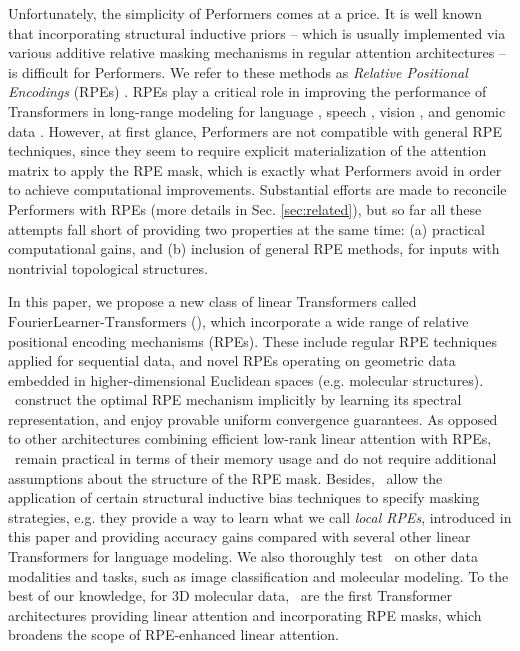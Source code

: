 Unfortunately, the simplicity of Performers comes at a price. It is well known that incorporating structural inductive priors -- which is usually implemented via various additive relative masking mechanisms in regular attention architectures -- is difficult for Performers. We refer to these methods as \textit{Relative Positional Encodings} (RPEs) \cite{shaw,raffel,li2021can,luo2022your}.
RPEs play a critical role in improving the performance of Transformers in long-range modeling for language \cite{dai-etal-2019-transformer}, speech \cite{liutkus}, vision \cite{wupeng}, and genomic data \cite{Avsec2021EffectiveGE}. However, at first glance, Performers are not compatible with general RPE techniques, since they seem to require explicit materialization of the attention matrix to apply the RPE mask, which is exactly what Performers avoid in order to achieve computational improvements.
Substantial efforts are made to reconcile Performers with RPEs (more details in Sec. \ref{sec:related}), but so far all these attempts fall short of providing two properties at the same time: (a) practical computational gains, and (b) inclusion of general RPE methods, for inputs with nontrivial topological structures.

In this paper, we propose a new class of linear Transformers called $\mathrm{FourierLearner}$-$\mathrm{Transformers}$ (\FLTs), which incorporate a wide range of relative positional encoding mechanisms (RPEs). These include regular RPE techniques applied for sequential data, and novel RPEs operating on geometric data embedded in higher-dimensional Euclidean spaces (e.g. molecular structures). \FLTs\ construct the optimal RPE mechanism implicitly by learning its spectral representation, and enjoy provable uniform convergence guarantees. As opposed to other architectures combining efficient low-rank linear attention with RPEs, \FLTs\ remain practical in terms of their memory usage and do not require additional assumptions about the structure of the RPE mask. Besides, \FLTs\ allow the application of certain structural inductive bias techniques to specify masking strategies, e.g. they provide a way to learn what we call \textit{local RPEs}, introduced in this paper and providing accuracy gains compared with several other linear Transformers for language modeling. We also thoroughly test \FLTs\ on other data modalities and tasks, such as image classification and molecular modeling. To the best of our knowledge, for 3D molecular data, \FLTs\ are the first Transformer architectures providing linear attention and incorporating RPE masks, which broadens the scope of RPE-enhanced linear attention.

